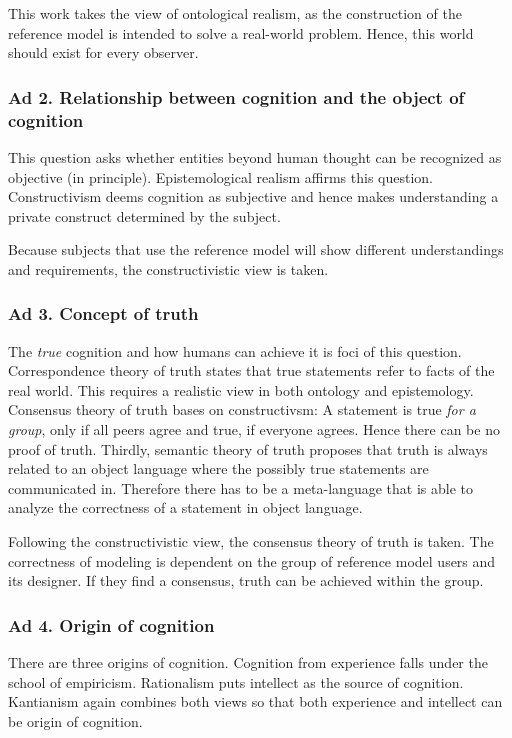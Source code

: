 This work takes the view of ontological realism, as the construction of the reference model is intended to solve a real-world problem. Hence, this world should exist for every observer. 

\subsubsection{Ad 2. Relationship between cognition and the object of cognition}
This question asks whether entities beyond human thought can be recognized as objective (in principle). Epistemological realism affirms this question. Constructivism deems cognition as subjective and hence makes understanding a private construct determined by the subject. 

Because subjects that use the reference model will show different understandings and requirements, the constructivistic view is taken. 

\subsubsection{Ad 3. Concept of truth}
The \textit{true} cognition and how humans can achieve it is foci of this question. Correspondence theory of truth states that true statements refer to facts of the real world. This requires a realistic view in both ontology and epistemology. Consensus theory of truth bases on constructivsm: A statement is true\textit{ for a group}, only if all peers agree and true, if everyone agrees. Hence there can be no proof of truth. Thirdly, semantic theory of truth proposes that truth is always related to an object language where the possibly true statements are communicated in. Therefore there has to be a meta-language that is able to analyze the correctness of a statement in object language. 

Following the constructivistic view, the consensus theory of truth is taken. The correctness of modeling is dependent on the group of reference model users and its designer. If they find a consensus, truth can be achieved within the group. 

\subsubsection{Ad 4. Origin of cognition}
There are three origins of cognition. Cognition from experience falls under the school of empiricism. Rationalism puts intellect as the source of cognition. Kantianism again combines both views so that both experience and intellect can be origin of cognition. 

